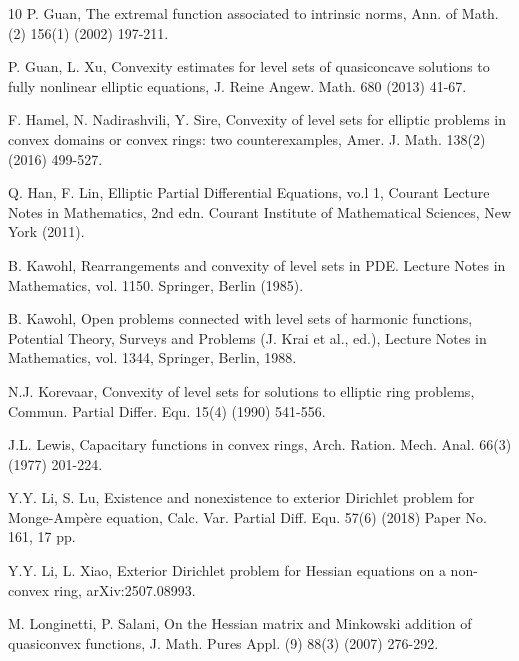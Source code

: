 \documentclass[reqno]{amsart}
\theoremstyle{remark}
\theoremstyle{definition}
\numberwithin{equation}{section}
\begin{document}
\begin{thebibliography}{10}
 P. Guan, The extremal function associated to intrinsic norms, Ann. of Math. (2) 156(1) (2002) 197-211.

 P. Guan, L. Xu, Convexity estimates for level sets of quasiconcave solutions to fully nonlinear elliptic
equations, J. Reine Angew. Math. 680 (2013) 41-67.

 F. Hamel, N. Nadirashvili, Y. Sire, Convexity of level sets for elliptic problems in convex domains or convex rings: two counterexamples, Amer. J. Math. 138(2) (2016) 499-527.

 Q. Han, F. Lin, Elliptic Partial Differential Equations, vo.l 1, Courant Lecture Notes in Mathematics, 2nd edn. Courant Institute of Mathematical Sciences, New York (2011).

 B. Kawohl, Rearrangements and convexity of level sets in PDE. Lecture Notes in Mathematics, vol. 1150. Springer, Berlin (1985).

 B. Kawohl, Open problems connected with level sets of harmonic functions, Potential Theory, Surveys and Problems (J. Krai et al., ed.), Lecture Notes in Mathematics, vol. 1344, Springer, Berlin, 1988.

 N.J. Korevaar, Convexity of level sets for solutions to elliptic ring problems, Commun. Partial Differ.
Equ. 15(4) (1990) 541-556.


 J.L. Lewis, Capacitary functions in convex rings, Arch. Ration. Mech. Anal. 66(3) (1977) 201-224. 

 Y.Y. Li, S. Lu, Existence and nonexistence to exterior Dirichlet problem for Monge-Amp\`ere
equation, Calc. Var. Partial Diff. Equ. 57(6) (2018) Paper No. 161, 17 pp.

 Y.Y. Li, L. Xiao, Exterior Dirichlet problem for Hessian equations on a non-convex ring, arXiv:2507.08993.


 M. Longinetti, P. Salani, On the Hessian matrix and Minkowski addition of quasiconvex functions, J.
Math. Pures Appl. (9) 88(3) (2007) 276-292.


\end{thebibliography}
\end{document}
